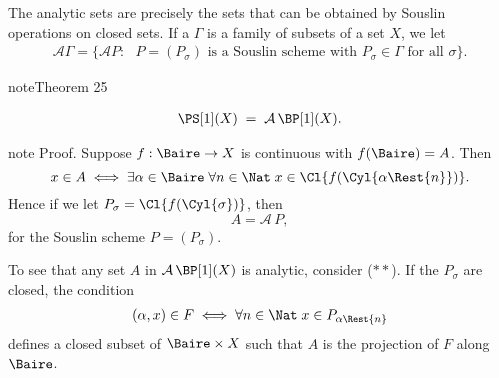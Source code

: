 \documentclass[letterpaper,10pt,english]{jupyterBook}
\begin{document}
\sphinxAtStartPar
The analytic sets are precisely the sets that can be obtained by Souslin operations on closed sets. If a \(\Gamma\) is a family of subsets of a set \(X\), we let
\begin{equation*}
\begin{split}
	\mathcal{A}\Gamma = \{\mathcal{A}P \colon \text{ $P = (P_\sigma)$ is a Souslin scheme with $P_\sigma \in \Gamma$ for all $\sigma$} \}.
\end{split}
\end{equation*}\label{analytic:analytic-Souslin-op}
\begin{sphinxadmonition}{note}{Theorem 25}


\begin{equation*}
\begin{split}
	\PS[1](X)\; = \; \mathcal{A}\,\BP[1](X).
\end{split}
\end{equation*}\end{sphinxadmonition}

\begin{sphinxadmonition}{note}
\sphinxAtStartPar
Proof. Suppose \(f: \Baire \to X\) is continuous with \(f(\Baire) = A\). Then
\begin{equation*}
x \in A \iff \exists \alpha  \in \Baire \; \forall n \in \Nat \; x \in \Cl{f(\Cyl{\alpha\Rest{n}})}.
\end{equation*}
\sphinxAtStartPar
Hence if we let \(P_\sigma = \Cl{f(\Cyl{\sigma})}\), then
\begin{equation*}
A =  \mathcal{A} \,P,
\end{equation*}
\sphinxAtStartPar
for the Souslin scheme \(P = (P_\sigma)\).

\sphinxAtStartPar
To see that any set \(A\) in \(\mathcal{A}\,\BP[1](X)\) is analytic, consider (\(**\)). If the \(P_\sigma\) are closed, the condition
\begin{equation*}
\begin{split}
    (\alpha,x) \in F \iff \forall n \in \Nat \; x \in P_{\alpha\Rest{n}}
\end{split}
\end{equation*}
\sphinxAtStartPar
defines a closed subset of \(\Baire \times X\) such that \(A\) is the projection of \(F\) along \(\Baire\).
\end{sphinxadmonition}
\end{document}
